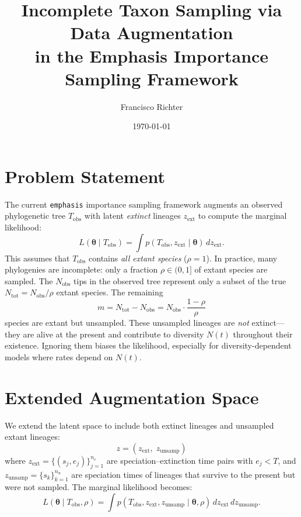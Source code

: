 \documentclass[11pt]{article}
\title{Incomplete Taxon Sampling via Data Augmentation\\in the Emphasis Importance Sampling Framework}
\author{Francisco Richter}
\date{\today}
\newcommand{\btheta}{\boldsymbol{\theta}}
\newcommand{\Tobs}{T_{\mathrm{obs}}}
\newcommand{\Nobs}{N_{\mathrm{obs}}}
\newcommand{\Ntot}{N_{\mathrm{tot}}}
\begin{document}
\maketitle

\section{Problem Statement}

The current \texttt{emphasis} importance sampling framework augments an observed phylogenetic tree $\Tobs$ with latent \emph{extinct} lineages $z_{\mathrm{ext}}$ to compute the marginal likelihood:
\begin{equation}
L(\btheta \mid \Tobs) = \int p(\Tobs, z_{\mathrm{ext}} \mid \btheta) \, dz_{\mathrm{ext}}.
\end{equation}
This assumes that $\Tobs$ contains \emph{all extant species} ($\rho = 1$). In practice, many phylogenies are incomplete: only a fraction $\rho \in (0,1]$ of extant species are sampled. The $\Nobs$ tips in the observed tree represent only a subset of the true $\Ntot = \Nobs / \rho$ extant species. The remaining
\begin{equation}
m = \Ntot - \Nobs = \Nobs \cdot \frac{1 - \rho}{\rho}
\end{equation}
species are extant but unsampled. These unsampled lineages are \emph{not} extinct---they are alive at the present and contribute to diversity $N(t)$ throughout their existence. Ignoring them biases the likelihood, especially for diversity-dependent models where rates depend on $N(t)$.

\section{Extended Augmentation Space}

We extend the latent space to include both extinct lineages and unsampled extant lineages:
\begin{equation}
z = (z_{\mathrm{ext}},\; z_{\mathrm{unsamp}})
\end{equation}
where $z_{\mathrm{ext}} = \{(s_j, e_j)\}_{j=1}^{n_e}$ are speciation--extinction time pairs with $e_j < T$, and $z_{\mathrm{unsamp}} = \{s_k\}_{k=1}^{n_u}$ are speciation times of lineages that survive to the present but were not sampled. The marginal likelihood becomes:
\begin{equation}\label{eq:marginal}
L(\btheta \mid \Tobs, \rho) = \int p(\Tobs, z_{\mathrm{ext}}, z_{\mathrm{unsamp}} \mid \btheta, \rho) \, dz_{\mathrm{ext}} \, dz_{\mathrm{unsamp}}.
\end{equation}
\end{document}
